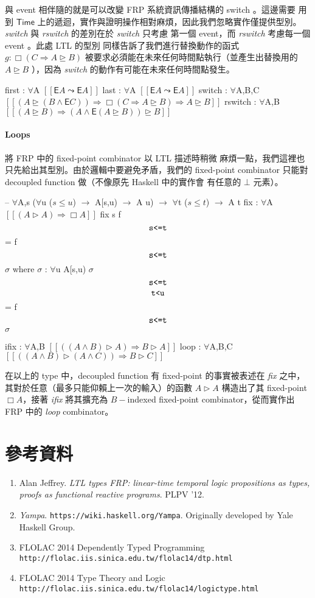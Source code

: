 \documentclass{article}
\newcommand{\llens}{[\![}
\newcommand{\rlens}{]\!]}
\newcommand{\Time}{\mathsf{Time}}
\newcommand{\TE}{\mathsf{E}}
\newcommand{\Wit}[1]{$\,\text{\texttt{#1}}\,$}
\newcommand{\Gs}{\sigma}
\begin{document}
  與 event 相伴隨的就是可以改變 FRP 系統資訊傳播結構的 switch 。這邊需要
  用到 $\Time$ 上的遞迴，實作與證明操作相對麻煩，因此我們忽略實作僅提供型別。
  \textit{switch} 與 \textit{rswitch} 的差別在於 \textit{switch} 只考慮
  第一個 event，而 \textit{rswitch} 考慮每一個 event 。此處 LTL 的型別
  同樣告訴了我們進行替換動作的函式 $g : \Box (C \Rightarrow A \unrhd B)$
  被要求必須能在未來任何時間點執行（並產生出替換用的 $A\unrhd B$ ），因為
  \textit{switch} 的動作有可能在未來任何時間點發生。

  \begin{code}
  first : $\forall${A} $\llens \TE A\leadsto \TE A\rlens$
  last : $\forall${A} $\llens \TE A\leadsto \TE A\rlens$
  switch : $\forall${A,B,C} $\llens (A\unrhd (B\land \TE C))\Rightarrow \Box(C\Rightarrow A\unrhd B) \Rightarrow A\unrhd B\rlens$
  rswitch : $\forall${A,B} $\llens (A\unrhd B) \Rightarrow (A\land \TE(A\unrhd B))\unrhd B\rlens$
  \end{code}
  \paragraph{Loops} 將 FRP 中的 fixed-point combinator 以 LTL 描述時稍微
  麻煩一點，我們這裡也只先給出其型別。由於邏輯中要避免矛盾，我們的 fixed-point
  combinator 只能對 decoupled function 做（不像原先 Haskell 中的實作會
  有任意的 $\bot$ 元素）。

  \begin{code}
  -- $\forall${A,s} ($\forall${u} ($s\le u$) $\to$ A[s,u) $\to$ A u) $\to$ $\forall${t} ($s\le t$) $\to$ A t
  fix : $\forall${A} $\llens (A\rhd A) \Rightarrow \Box A\rlens$
  fix {s} f $\Wit{s<=t}$ = f $\Wit{s<=t}$ $\Gs$ where
      $\Gs$ : $\forall${u} A[s,u)
      $\Gs$ $\Wit{s<=t}$ $\Wit{t<u}$ = f $\Wit{s<=t}$ $\Gs$

  ifix : $\forall${A,B} $\llens ((A\land B)\rhd A) \Rightarrow B\rhd A\rlens$
  loop : $\forall${A,B,C} $\llens ((A\land B)\rhd (A\land C)) \Rightarrow B\rhd C\rlens$
  \end{code}

  在以上的 type 中，decoupled function 有 fixed-point 的事實被表述在
  \textit{fix} 之中，其對於任意（最多只能仰賴上一次的輸入）的函數
  $A\rhd A$ 構造出了其 fixed-point $\Box A$，接著 \textit{ifix} 將其擴充為
  $B-$indexed fixed-point combinator，從而實作出 FRP 中的 \textit{loop}
  combinator。

\section{參考資料}
\begin{enumerate}
  \item Alan Jeffrey. \textit{LTL types FRP: linear-time temporal logic propositions as types, proofs as functional reactive programs}. PLPV '12.
  \item \textit{Yampa}. \texttt{https://wiki.haskell.org/Yampa}.
  Originally developed by Yale Haskell Group.
  \item FLOLAC 2014 Dependently Typed Programming \texttt{http://flolac.iis.sinica.edu.tw/flolac14/dtp.html}
  \item FLOLAC 2014 Type Theory and Logic \texttt{http://flolac.iis.sinica.edu.tw/flolac14/logictype.html}
\end{enumerate}
\end{document}
